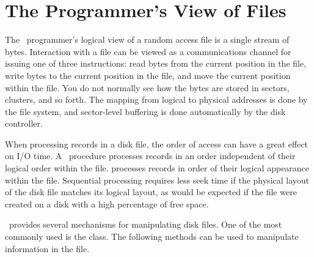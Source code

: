 \section{The Programmer's View of Files}
\label{RandFiles}

The \Lang\ programmer's logical view of a random
access file is a single stream of bytes.
Interaction with a file can be viewed as a communications
channel for issuing one of three instructions: read bytes from the
current position in the file, write bytes to the current position in
the file, and move the current position within the file.
You do not normally see how the bytes are stored in sectors,
clusters, and so forth.
The mapping from logical to physical addresses is done by the file
system, and sector-level buffering is done automatically by the
disk controller.

When processing records in a disk file, the order of access can have a
great effect on I/O time.
A~ procedure processes records in an order independent
of their logical order within the file.
 processes records in order of
their logical appearance within the file.
Sequential processing requires less seek time if the physical layout
of the disk file matches its logical layout, as would be expected if
the file were created on a disk with a high percentage of free space.

{}{}
\Lang\ provides several mechanisms for manipulating disk files.
One of the most commonly used is the
class.
The following methods can be used to manipulate information in the
file.

